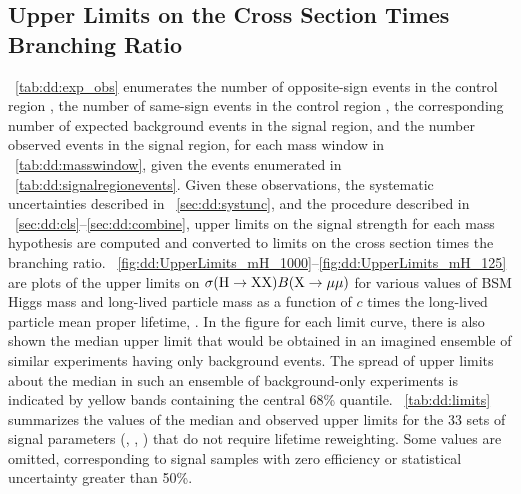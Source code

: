 \subsection{Upper Limits on the Cross Section Times Branching Ratio}
\label{sec:dd:limits}
\Tab~\ref{tab:dd:exp_obs} enumerates the number of opposite-sign events in the control region , the number of same-sign events in the control region , the corresponding number of expected background events in the signal region, and the number observed events in the signal region, for each mass window in \Tab~\ref{tab:dd:masswindow}, given the events enumerated in \Tab~\ref{tab:dd:signalregionevents}.
Given these observations, the systematic uncertainties described in \Sec~\ref{sec:dd:systunc}, and the procedure described in \Secs~\ref{sec:dd:cls}--\ref{sec:dd:combine}, upper limits on the signal strength for each mass hypothesis are computed and converted to limits on the cross section times the branching ratio.
\Figs~\ref{fig:dd:UpperLimits_mH_1000}--\ref{fig:dd:UpperLimits_mH_125} are plots of the upper limits on $\sigma(\mathrm{H}\to \mathrm{X}\mathrm{X})B(\mathrm{X}\to\mathrm{\mu}\mathrm{\mu})$ for various values of BSM Higgs mass \mH and long-lived particle mass \mX as a function of $c$ times the long-lived particle mean proper lifetime, \cTau.
In the figure for each limit curve, there is also shown the median upper limit that would be obtained in an imagined ensemble of similar experiments having only background events.
The spread of upper limits about the median in such an ensemble of background-only experiments is indicated by yellow bands containing the central 68\% quantile.
\Tab~\ref{tab:dd:limits} summarizes the values of the median and observed upper limits for the 33 sets of signal parameters (\mH, \mX, \cTau) that do not require lifetime reweighting.
Some values are omitted, corresponding to signal samples with zero efficiency or statistical uncertainty greater than 50\%.


